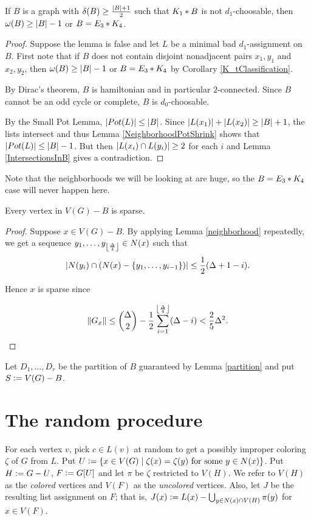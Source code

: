 \begin{lem}\label{neighborhood}
If $B$ is a graph with $\delta(B) \geq \frac{\left|B\right| + 1}{2}$ such that
$K_1 \mbox{\hspace{2 pt}$\ast$\hspace{2 pt}} B$ is not $d_1$-choosable, then $\omega(B) \geq \left|B\right| - 1$ or
$B = E_3 \mbox{\hspace{2 pt}$\ast$\hspace{2 pt}} K_4$.
\end{lem}
\begin{proof}
Suppose the lemma is false and let $L$ be a minimal bad $d_1$-assignment on $B$.
First note that if $B$ does not contain disjoint nonadjacent pairs $x_1, y_1$
and $x_2, y_2$, then $\omega(B) \geq \left|B\right| - 1$ or
$B = E_3 \mbox{\hspace{2 pt}$\ast$\hspace{2 pt}} K_4$ by Corollary \ref{K_tClassification}.

By Dirac's theorem, $B$ is hamiltonian and in particular $2$-connected. Since
$B$ cannot be an odd cycle or complete, $B$ is $d_0$-choosable.

By the Small Pot Lemma, $\left|Pot(L)\right| \leq \left|B\right|$.  Since $\left|L(x_1)\right| +
\left|L(x_2)\right| \geq \left|B\right| + 1$, the lists intersect and thus Lemma
\ref{NeighborhoodPotShrink} shows that $\left|Pot(L)\right| \leq \left|B\right| - 1$. But
then $\left|L(x_i) \cap L(y_i)\right| \geq 2$ for each $i$ and Lemma
\ref{IntersectionsInB} gives a contradiction.
\end{proof}

Note that the neighborhoods we will be looking at are huge, so the $B =
E_3 \mbox{\hspace{2 pt}$\ast$\hspace{2 pt}} K_4$ case will never happen here.

\begin{lem}
Every vertex in $V(G) - B$ is sparse.
\end{lem}
\begin{proof}
Suppose $x \in V(G) - B$.
By applying Lemma \ref{neighborhood} repeatedly, we get a sequence $y_1,
\ldots, y_{\left\lfloor\frac{\Delta}{4}\right\rfloor} \in N(x)$ such that 
\[\left|N(y_i) \cap (N(x) - \left\{ y_1, \ldots, y_{i-1} \right\})\right| \leq \frac12 (\Delta +
1 - i).\]

\noindent Hence $x$ is sparse since

\[\left\Vert G_x\right\Vert \leq \binom{\Delta}{2} -
\frac12\sum_{i=1}^{\left\lfloor\frac{\Delta}{4}\right\rfloor} (\Delta - i) < \frac25 \Delta^2.\]
\end{proof}

\noindent Let $D_1, \ldots, D_r$ be the partition of $B$ guaranteed by Lemma
\ref{partition} and put $S \mathrel{\mathop:}= V(G) - B$.

\section{The random procedure}
For each vertex $v$, pick $c \in L(v)$ at random to get a possibly improper
coloring $\zeta$ of $G$ from $L$.  Put $U \mathrel{\mathop:}= \left\{ x \in V(G) \mid \zeta(x) =
\zeta(y) \text{ for some $y \in N(x)$} \right\}$.  Put $H \mathrel{\mathop:}= G - U$, $F
\mathrel{\mathop:}= G[U]$ and let $\pi$ be $\zeta$ restricted to $V(H)$.  We refer
to $V(H)$ as the \emph{colored} vertices and $V(F)$ as the \emph{uncolored}
vertices.  Also, let $J$ be the resulting list assignment on $F$; that is, $J(x)
\mathrel{\mathop:}= L(x) - \bigcup_{y \in N(x) \cap V(H)} \pi(y)$ for $x \in V(F)$.

